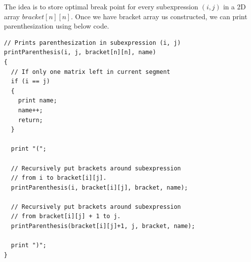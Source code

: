 \RayNotesEnd

\textbf{}

The idea is to store optimal break point for every subexpression $(i,j)$ in
a 2D array $bracket[n][n]$. Once we have bracket array us constructed, we
can print parenthesization using below code.
\begin{lstlisting}[style=raycppnewsnippet]
// Prints parenthesization in subexpression (i, j)
printParenthesis(i, j, bracket[n][n], name)
{
  // If only one matrix left in current segment
  if (i == j)
  {
    print name;
    name++;
    return;
  }

  print "(";

  // Recursively put brackets around subexpression
  // from i to bracket[i][j].
  printParenthesis(i, bracket[i][j], bracket, name);

  // Recursively put brackets around subexpression
  // from bracket[i][j] + 1 to j.
  printParenthesis(bracket[i][j]+1, j, bracket, name);

  print ")";
}
\end{lstlisting}

